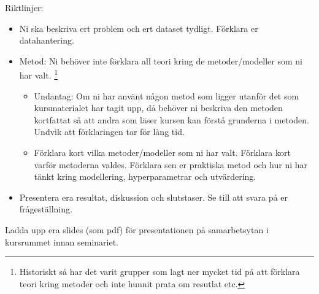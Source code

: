 \documentclass[a4paper]{article}
\begin{document}
Riktlinjer:
\begin{itemize}
    \item Ni ska beskriva ert problem och ert dataset tydligt. Förklara er datahantering.
    \item Metod: Ni behöver inte förklara all teori kring de metoder/modeller som ni har valt.
    \footnote{Historiskt så har det varit grupper som lagt ner mycket tid på att förklara teori kring metoder och inte hunnit prata om resutlat etc.}
    \begin{itemize}
        \item Undantag: Om ni har använt någon metod som ligger utanför det som 
        kursmaterialet har tagit upp, då behöver ni beskriva den metoden kortfattat så
        att andra som läser kursen kan förstå grunderna i metoden. Undvik att förklaringen tar för lång tid.
        \item Förklara kort vilka metoder/modeller som ni har valt. Förklara kort varför metoderna valdes. Förklara sen er
        praktiska metod och hur ni har tänkt kring modellering, hyperparametrar och utvärdering.
        \end{itemize}
    \item Presentera era resultat, diskussion och slutstaser. Se till att svara på er frågeställning.
\end{itemize}

Ladda upp era slides (som pdf) för presentationen på samarbetsytan i kursrummet innan seminariet.
\end{document}
